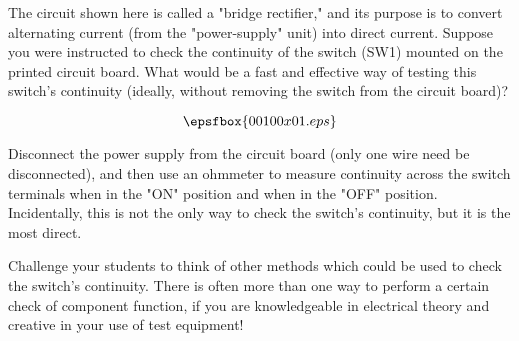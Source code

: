

The circuit shown here is called a "bridge rectifier," and its purpose is to convert alternating current (from the "power-supply" unit) into direct current.  Suppose you were instructed to check the continuity of the switch (SW1) mounted on the printed circuit board.  What would be a fast and effective way of testing this switch's continuity (ideally, without removing the switch from the circuit board)?

$$\epsfbox{00100x01.eps}$$







Disconnect the power supply from the circuit board (only one wire need be disconnected), and then use an ohmmeter to measure continuity across the switch terminals when in the "ON" position and when in the "OFF" position.  Incidentally, this is not the only way to check the switch's continuity, but it is the most direct.







Challenge your students to think of other methods which could be used to check the switch's continuity.  There is often more than one way to perform a certain check of component function, if you are knowledgeable in electrical theory and creative in your use of test equipment!





